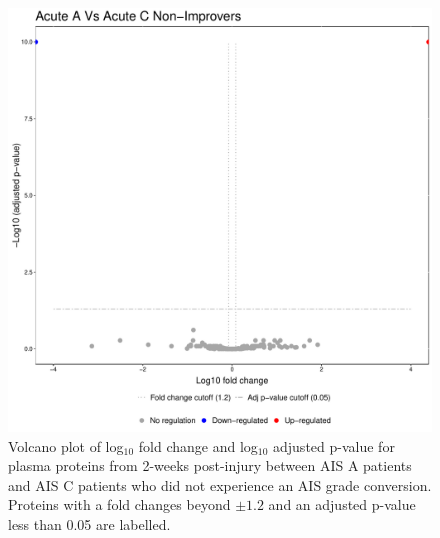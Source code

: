 \documentclass[9pt,lineno]{elife}
\begin{document}
\begin{landscape}
\begin{landscape}
\begin{landscape}
\begin{landscape}
\begin{figure}
\includegraphics[width=1\linewidth]{figures/openms_protein_quantification/label_free/volcano_plots/openms_volcano_plot_2021-08-10_0002} \caption{Volcano plot of log\(_10\) fold change and log\(_10\) adjusted p-value for plasma proteins from 2-weeks post-injury between AIS A patients and AIS C patients who did not experience an AIS grade conversion. Proteins with a fold changes beyond \(\pm 1.2\) and an adjusted p-value less than 0.05 are labelled.}\label{fig:volc-plot-acute-a-vs-acute-c-nonimp}
\end{figure}




\end{landscape}
\end{landscape}
\end{landscape}
\end{landscape}
\end{document}
